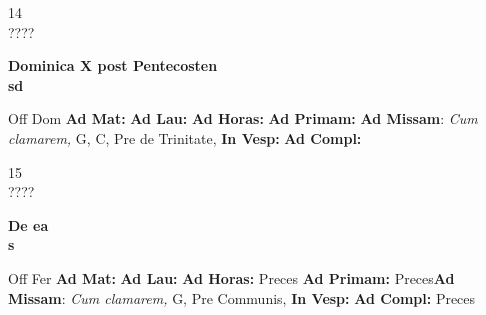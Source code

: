 \documentclass[10pt, openany]{book}
\begin{document}
    \begin{center}
        \begin{minipage}{3.5in}
            \vspace{2em}
            \begin{minipage}{0.5in}
                {\Huge 14} \\
                {\normalsize ????}
            \end{minipage}
            \begin{minipage}{3.0in}
                \textbf{ \large Dominica X post Pentecosten \\
                \textnormal{\normalsize sd}}

            \end{minipage}
            \begin{justify}Off Dom
                \textbf{Ad Mat: }
                \textbf{Ad Lau: }
                \textbf{Ad Horas: }
                \textbf{Ad Primam: }\textbf{Ad Missam}: \textit{Cum clamarem,} G, C, Pre de Trinitate, 
                \textbf{In Vesp: }
                \textbf{Ad Compl: }
            \end{justify}
        \end{minipage}
    \end{center}

    \begin{center}
        \begin{minipage}{3.5in}
            \vspace{2em}
            \begin{minipage}{0.5in}
                {\Huge 15} \\
                {\normalsize ????}
            \end{minipage}
            \begin{minipage}{3.0in}
                \textbf{ \large De ea \\
                \textnormal{\normalsize s}}

            \end{minipage}
            \begin{justify}Off Fer
                \textbf{Ad Mat: }
                \textbf{Ad Lau: }
                \textbf{Ad Horas: }Preces
                \textbf{Ad Primam: }Preces\textbf{Ad Missam}: \textit{Cum clamarem,} G, Pre Communis, 
                \textbf{In Vesp: }
                \textbf{Ad Compl: }Preces
            \end{justify}
        \end{minipage}
    \end{center}
\end{document}
